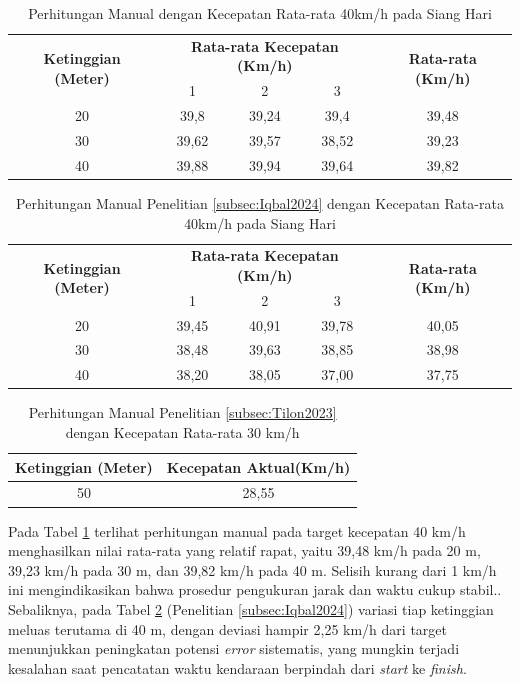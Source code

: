 \begin{table}[H]
	\caption{Perhitungan Manual dengan Kecepatan Rata-rata 40km/h pada Siang Hari}
    \label{table:40km/h-siang-manual}
	\centering
	\begin{tabular}{|c|c|c|c|c|}
		\hline
		\multirow{2}{*}{\textbf{Ketinggian (Meter)}} & \multicolumn{3}{c|}{\textbf{Rata-rata Kecepatan (Km/h)}} & \multirow{2}{*}{\textbf{Rata-rata (Km/h)}} \\ \cline{2-4}
		& 1 & 2 & 3 & \\ \hline
		20 & 39,8 & 39,24 & 39,4 & 39,48 \\
		30 & 39,62 & 39,57 & 38,52 & 39,23 \\
		40 & 39,88 & 39,94 & 39,64 & 39,82 \\ \hline
	\end{tabular}
\end{table}
\vspace{-10pt}
\begin{table}[H]
	\caption{Perhitungan Manual Penelitian \ref{subsec:Iqbal2024} dengan Kecepatan Rata-rata 40km/h pada Siang Hari}
    \label{table:40km/h-siang-manual-iqbal}
	\centering
	\begin{tabular}{|c|c|c|c|c|}
		\hline
		\multirow{2}{*}{\textbf{Ketinggian (Meter)}} & \multicolumn{3}{c|}{\textbf{Rata-rata Kecepatan (Km/h)}} & \multirow{2}{*}{\textbf{Rata-rata (Km/h)}} \\ \cline{2-4}
		& 1 & 2 & 3 & \\ \hline
		20 & 39,45 & 40,91 & 39,78 & 40,05 \\
		30 & 38,48 & 39,63 & 38,85 & 38,98 \\
		40 & 38,20 & 38,05 & 37,00 & 37,75 \\ \hline
	\end{tabular}
\end{table}
\vspace{-10pt}
\begin{table}[H]
	\caption{Perhitungan Manual Penelitian \ref{subsec:Tilon2023} dengan Kecepatan Rata-rata 30 km/h}
    \label{table:30kmh-manual-Tilon}
	\centering
	\begin{tabular}{|c|c|}
		\hline
		\textbf{Ketinggian (Meter)} & \textbf{Kecepatan Aktual(Km/h)}\\ \hline
		50 & 28,55 \\ \hline
	\end{tabular}
\end{table}

Pada Tabel \ref{table:40km/h-siang-manual} terlihat perhitungan manual pada target kecepatan 40 km/h menghasilkan nilai rata-rata yang relatif rapat, yaitu 39,48 km/h pada 20 m, 39,23 km/h pada 30 m, dan 39,82 km/h pada 40 m. Selisih kurang dari 1 km/h ini mengindikasikan bahwa prosedur pengukuran jarak dan waktu cukup stabil.. Sebaliknya, pada Tabel \ref{table:40km/h-siang-manual-iqbal} (Penelitian \ref{subsec:Iqbal2024}) variasi tiap ketinggian meluas terutama di 40 m, dengan deviasi hampir 2,25 km/h dari target menunjukkan peningkatan potensi \emph{error} sistematis, yang mungkin terjadi kesalahan saat pencatatan waktu kendaraan berpindah dari \emph{start} ke \emph{finish}.

